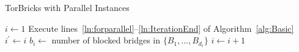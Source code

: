 \documentclass[letterpaper,twocolumn,10pt]{article}
\newcommand{\algFont}{\fontsize{10}{13}\selectfont}
\newcommand{\bricks}{}
\def\bricks/{\mbox{TorBricks}}
\begin{document}
\begin{algorithm}
	\caption{\bricks/ with Parallel Instances}
	\label{alg:parallel}
	\vspace{0.4em}
		
	\algFont \vspace{2pt}
	\begin{algorithmic}[1]
		\State ${i \gets 1}$ 
		\While{\True}
			\State Execute lines~\ref{ln:forparallel}--\ref{ln:IterationEnd} of Algorithm~\ref{alg:Basic}
			\State $i^\prime \gets i$
			 
				\State $b_i \gets$ number of blocked bridges in $\{B_1, ..., B_{d_i}\}$
			\EndWhile
				\State $i \gets i+1$	\label{ln:critical}
			\EndIf
		\EndWhile
	\end{algorithmic}	
\end{algorithm}
\end{document}

